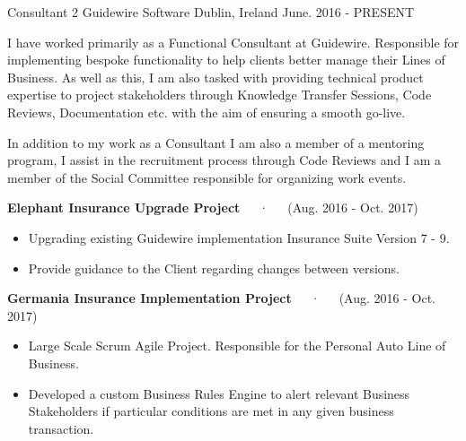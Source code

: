

\begin{cventries}
   \cventry
    {Consultant 2} %
    {Guidewire Software} %
    {Dublin, Ireland} %
    {June. 2016 - PRESENT} %
    {
    \begin{cvitems} %
    	\item {I have worked primarily as a Functional Consultant at Guidewire. Responsible for implementing  bespoke functionality to help clients better manage their Lines of Business. As well as this, I am also tasked with providing technical product expertise to project stakeholders through Knowledge Transfer Sessions, Code Reviews, Documentation etc. with the aim of ensuring a smooth go-live. }
    	\item {In addition to my work as a Consultant I am also a member of a mentoring program, I assist in the recruitment process through Code Reviews and I am a member of the Social Committee responsible for organizing work events.
{\\}    	
}
        \item {\textbf{Elephant Insurance Upgrade Project}~~~·~~~(Aug. 2016 - Oct. 2017)
		\begin{itemize}
			\item Upgrading existing Guidewire implementation Insurance Suite Version 7 - 9. 
			\item Provide guidance to the Client regarding changes between versions. {~\\}
		\end{itemize}
}
    \item {\textbf{Germania Insurance Implementation Project}~~~·~~~(Aug. 2016 - Oct. 2017)
		\begin{itemize}
  		\item Large Scale Scrum Agile Project. Responsible for the Personal Auto Line of Business.
  		\item Developed a custom Business Rules Engine to alert relevant Business Stakeholders if particular 							conditions are met in any given business transaction.

\end{itemize}}
\end{cvitems}}
\end{cventries}
